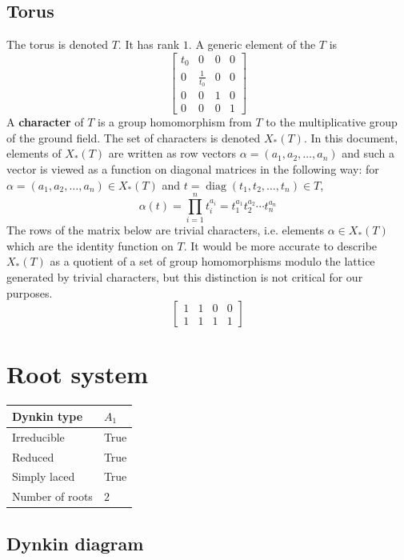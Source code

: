 \documentclass[11pt]{article}
\newcommand{\tbf}{\textbf}
\DeclareMathOperator{\diag}{diag}
\theoremstyle{definition}
\begin{document}
\subsection{Torus}

The torus is denoted $T$. It has rank $1$. A generic element of the $T$ is
\[
\left[\begin{matrix}t_{0} & 0 & 0 & 0\\0 & \frac{1}{t_{0}} & 0 & 0\\0 & 0 & 1 & 0\\0 & 0 & 0 & 1\end{matrix}\right]
\]
A \tbf{character} of $T$ is a group homomorphism from $T$ to the multiplicative group of the ground field. The set of characters is denoted $X_*(T)$. In this document, elements of $X_*(T)$ are written as row vectors $\alpha = (a_1, a_2, \ldots, a_n)$ and such a vector is viewed as a function on diagonal matrices in the following way: for $\alpha = (a_1, a_2, \ldots, a_n) \in X_*(T)$ and $t = \diag(t_1, t_2, \ldots, t_n) \in T$, 
\[
	\alpha(t) = \prod_{i=1}^n t_i^{a_i} = t_1^{a_1} t_2^{a_2} \cdots t_n^{a_n}
\]
The rows of the matrix below are trivial characters, i.e. elements $\alpha \in X_*(T)$ which are the identity function on $T$. It would be more accurate to describe $X_*(T)$ as a quotient of a set of group homomorphisms modulo the lattice generated by trivial characters, but this distinction is not critical for our purposes.
\[
\left[\begin{matrix}1 & 1 & 0 & 0\\1 & 1 & 1 & 1\end{matrix}\right]
\]

\newpage
\section{Root system}

\begin{tabular}{|l|l|}
	\hline
    Dynkin type & $A_1$ \\
	\hline
    Irreducible & True \\
	\hline
    Reduced & True \\
	\hline
	Simply laced & True \\
	\hline
	Number of roots & $2$ \\
	\hline
\end{tabular}

\subsection{Dynkin diagram}
\end{document}
